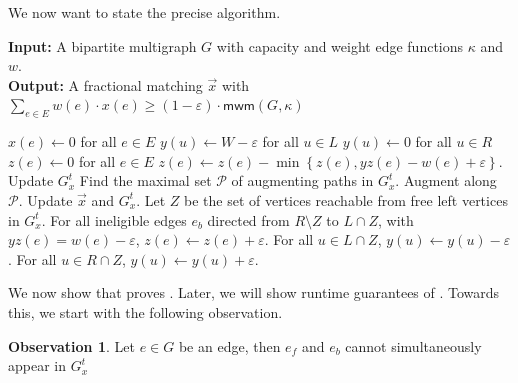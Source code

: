 \documentclass[a4paper,11pt]{article}
\newcommand{\set}[1]{\ensuremath{\left\{ #1 \right\}}}
\newcommand{\eps}{\varepsilon}
\renewcommand{\algorithmicrequire}{\textbf{Input:}}
\renewcommand{\algorithmicensure}{\textbf{Output:}}
\theoremstyle{definition}
\theoremstyle{definition}
\theoremstyle{definition}
\theoremstyle{definition}
\theoremstyle{definition}
\theoremstyle{definition}
\theoremstyle{definition}
\newtheorem{observation2}[definition2]{Observation}
\theoremstyle{definition}
\theoremstyle{definition}
\theoremstyle{definition}
\theoremstyle{definition}
\theoremstyle{definition}
\theoremstyle{definition}
\theoremstyle{definition}
\theoremstyle{definition}
\begin{document}
We now want to state the precise algorithm.
\begin{algorithm}[H] 
	\algorithmicrequire{ A bipartite multigraph $G$ with capacity and weight edge functions $\kappa$ and $w$.}\\
	\algorithmicensure{ A fractional matching $\vec{x}$ with $\sum_{e\in E}w(e)\cdot x(e)\geqslant (1-\eps)\cdot \textsf{mwm}(G,\kappa)$}
	\caption{\textsc{Weighted-Frac-Matching}($G,\kappa,\eps$)}
	\begin{algorithmic}[1]
		\State $x(e)\leftarrow 0$ for all $e\in E$ 
		\State $y(u)\leftarrow W-\eps$ for all $u\in L$ 
		\State $y(u)\leftarrow 0$ for all $u\in R$ 
		\State $z(e)\leftarrow 0$ for all $e\in E$ 
	\EndProcedure
		\State $z(e)\leftarrow z(e)-\min\set{z(e), yz(e)-w(e)+\eps}$. \Comment{Either $z(e)=0$, or $e\notin G^t_x$ as $yz(e)=w(e)-\eps$} \label{item:zadj} 
		\EndFor
		\State Update $G^t_x$
		\State Find the maximal set $\mathcal{P}$ of augmenting paths in $G^t_x$. \label{item:augpath}
		\State Augment along $\mathcal{P}$. Update $\vec{x}$ and $G^t_x$.  \label{item:augmentation}
		\EndProcedure
		\State Let $Z$ be the set of vertices reachable from free left vertices in $G^t_x$.
		\State For all ineligible edges $e_b$ directed from $R\setminus Z$ to $L\cap Z$, with $yz(e)=w(e)-\eps$, $z(e)\leftarrow z(e)+\eps$. \label{line:adjz}
		\State For all $u\in L\cap Z$, $y(u)\leftarrow y(u)-\eps$. \label{line:Ladj}
		\State For all $u\in R\cap Z$, $y(u)\leftarrow y(u)+\eps$.\label{line:Radj}
	\EndProcedure
		\EndWhile
		\end{algorithmic}
	 \label{alg:weightedfracmatching}
\end{algorithm}

We now show that  proves . Later, we will show runtime guarantees of . Towards this, we start with the following observation.

\begin{observation2}\label{obs:simul}
    Let $e\in G$ be an edge, then $e_f$ and $e_b$ cannot simultaneously appear in $G^t_x$
\end{observation2}
\end{document}
